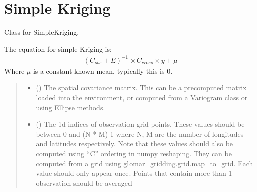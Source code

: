 \documentclass[letterpaper,10pt,english]{sphinxmanual}
\begin{document}
\section{Simple Kriging}
\label{\detokenize{kriging:simple-kriging}}

\begin{fulllineitems}
\label{\detokenize{kriging:glomar_gridding.kriging.SimpleKriging}}
\pysigstartsignatures
\pysiglinewithargsret
{}
{\sphinxparamcomma {}\sphinxparamcomma {}\sphinxparamcomma {}}
{}
\pysigstopsignatures
\sphinxAtStartPar
Class for SimpleKriging.

\sphinxAtStartPar
The equation for simple Kriging is:
\begin{equation*}
\begin{split}(C_{obs} + E)^{-1} \times C_{cross} \times y + \mu\end{split}
\end{equation*}
\sphinxAtStartPar
Where \(\mu\) is a constant known mean, typically this is 0.
\begin{quote}\begin{description}
\begin{itemize}
\item {}
\sphinxAtStartPar
{} () \textendash{} The spatial covariance matrix. This can be a pre\sphinxhyphen{}computed matrix loaded
into the environment, or computed from a Variogram class or using
Ellipse methods.

\item {}
\sphinxAtStartPar
{} (\sphinxstyleliteralemphasis{\sphinxupquote{{[}}}\sphinxstyleliteralemphasis{\sphinxupquote{{]} }}\sphinxstyleliteralemphasis{\sphinxupquote{| }}\sphinxstyleliteralemphasis{\sphinxupquote{{[}}}\sphinxstyleliteralemphasis{\sphinxupquote{{]}}}) \textendash{} The 1d indices of observation grid points. These values should be
between 0 and (N * M) \sphinxhyphen{} 1 where N, M are the number of longitudes
and latitudes respectively. Note that these values should also be
computed using “C” ordering in numpy reshaping. They can be
computed from a grid using glomar\_gridding.grid.map\_to\_grid. Each
value should only appear once. Points that contain more than 1
observation should be averaged


\end{itemize}
\end{description}
\end{quote}
\end{fulllineitems}
\end{document}

